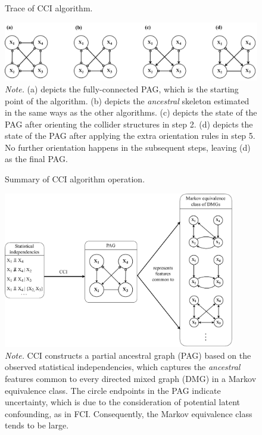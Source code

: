 \documentclass[twoside, 11pt]{article}
\begin{document}
\begin{figure}[!htbp]
    \centering
        \caption{Trace of CCI algorithm.}
        \includegraphics[width=1\textwidth]{figures/Fig8.pdf}
        \vspace{1mm}
        \caption*{\small{\textit{Note.} (a) depicts the fully-connected PAG, which is the starting point of the algorithm. (b) depicts the \textit{ancestral} skeleton estimated in the same ways as the other algorithms. (c) depicts the state of the PAG after orienting the collider structures in step 2. (d) depicts the state of the PAG after applying the extra orientation rules in step 5. No further orientation happens in the subsequent steps, leaving (d) as the final PAG.}}
    \label{fig:9}
\end{figure}


\begin{figure}[H]
    \centering
        \caption{Summary of CCI algorithm operation.}
        \includegraphics[width=0.9\textwidth]{figures/Fig9.pdf}
        \vspace{3mm}
        \caption*{\small{\textit{Note.} CCI constructs a partial ancestral graph (PAG) based on the observed statistical independencies, which captures the \textit{ancestral} features common to every directed mixed graph (DMG) in a Markov equivalence class. 
        The circle endpoints in the PAG indicate uncertainty, which is due to the consideration of potential latent confounding, as in FCI. Consequently, the Markov equivalence class tends to be large.}}

    \label{fig:8}
\end{figure}
\end{document}
